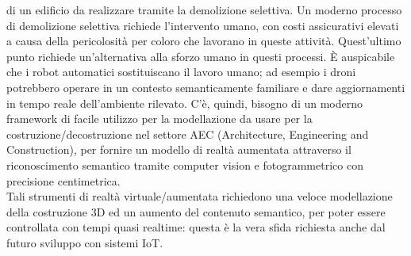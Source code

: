 di un edificio da realizzare tramite la demolizione selettiva. Un moderno processo di demolizione selettiva richiede l'intervento umano,
con costi assicurativi elevati a causa della pericolosità per coloro che lavorano in queste attività.
Quest'ultimo punto richiede un'alternativa alla sforzo umano in questi processi. \`E auspicabile che i robot automatici
sostituiscano il lavoro umano; ad esempio i droni potrebbero operare in un
contesto semanticamente familiare e dare aggiornamenti in tempo reale dell'ambiente rilevato.
C'è, quindi, bisogno di un moderno framework di facile utilizzo per la modellazione da usare per la
costruzione/decostruzione nel settore AEC (Architecture, Engineering and Construction),
per fornire un modello di realtà aumentata attraverso il riconoscimento semantico tramite computer vision e
fotogrammetrico con precisione centimetrica.\\
Tali strumenti di realtà virtuale/aumentata
richiedono una veloce modellazione della costruzione 3D ed un aumento del contenuto semantico, per poter essere controllata con
tempi quasi realtime: questa è la vera sfida richiesta anche dal futuro sviluppo con sistemi IoT.
\newpage
